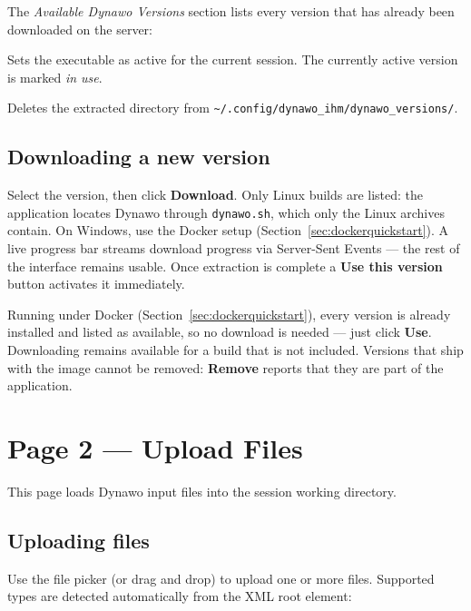 \documentclass[a4paper,11pt]{article}
\newcommand{\code}[1]{\texttt{\small #1}}
\begin{document}
The \emph{Available Dynawo Versions} section lists every version that has
already been downloaded on the server:

\begin{description}[leftmargin=2em]
  \item[\textbf{Use}] Sets the executable as active for the current session.
    The currently active version is marked \emph{in use}.
  \item[\textbf{Remove}] Deletes the extracted directory from
    \code{\textasciitilde/.config/dynawo\_ihm/dynawo\_versions/}.
\end{description}

\subsection{Downloading a new version}

Select the version, then click \textbf{Download}. Only Linux builds are
listed: the application locates Dynawo through \code{dynawo.sh}, which only the
Linux archives contain. On Windows, use the Docker setup
(Section~\ref{sec:dockerquickstart}).
A live progress bar streams download progress via Server-Sent Events --- the
rest of the interface remains usable. Once extraction is complete a
\textbf{Use this version} button activates it immediately.

\begin{notebox}
Running under Docker (Section~\ref{sec:dockerquickstart}), every version
is already installed and listed as available, so no download is needed --- just
click \textbf{Use}. Downloading remains available for a build that is not
included. Versions that ship with the image cannot be removed:
\textbf{Remove} reports that they are part of the application.
\end{notebox}

\section{Page 2 --- Upload Files}

This page loads Dynawo input files into the session working directory.

\subsection{Uploading files}

Use the file picker (or drag and drop) to upload one or more files. Supported
types are detected automatically from the XML root element:
\end{document}
